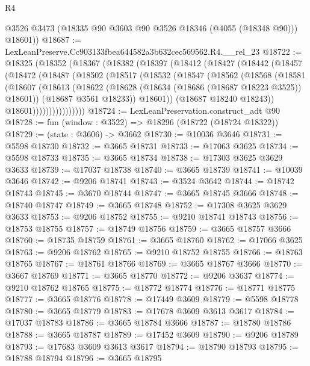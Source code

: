 \begin{lexlean}{R4}
\begin{coremodule}
        @3526
        @3473
        (@18335 @90 @3603 @90 @3526 @18346 (@4055 (@18348 @90)))
        @18601))
@18687 := LexLeanPreserve.Cc903133fbea644582a3b632cec569562.R4.__rel_23
@18722 := @18325
    (@18352
      (@18367
        (@18382
          (@18397
            (@18412
              (@18427
                (@18442
                  (@18457
                    (@18472
                      (@18487
                        (@18502
                          (@18517
                            (@18532
                              (@18547
                                (@18562
                                  (@18568
                                    (@18581
                                      (@18607
                                        (@18613
                                          (@18622
                                            (@18628 (@18634 (@18686 (@18687 @18223 @3525)) @18601))
                                            (@18687 @3561 @18233))
                                          @18601))
                                      (@18687 @18240 @18243))
                                    @18601))))))))))))))))
@18724 := LexLeanPreservation.construct_adt @90
@18728 := fun (window : @3522) => @18296 (@18722 (@18724 @18322))
@18729 := (state : @3606) -> @3662
@18730 := @10036 @3646
@18731 := @5598 @18730
@18732 := @3665 @18731
@18733 := @17063 @3625
@18734 := @5598 @18733
@18735 := @3665 @18734
@18738 := @17303 @3625 @3629 @3633
@18739 := @17037 @18738
@18740 := @3665 @18739
@18741 := @10039 @3646
@18742 := @9206 @18741
@18743 := @3524 @3642
@18744 := @18742 @18743
@18745 := @3670 @18744
@18747 := @3665 @18745 @3666
@18748 := @18740 @18747
@18749 := @3665 @18748
@18752 := @17308 @3625 @3629 @3633
@18753 := @9206 @18752
@18755 := @9210 @18741 @18743
@18756 := @18753 @18755
@18757 := @18749 @18756
@18759 := @3665 @18757 @3666
@18760 := @18735 @18759
@18761 := @3665 @18760
@18762 := @17066 @3625
@18763 := @9206 @18762
@18765 := @9210 @18752 @18755
@18766 := @18763 @18765
@18767 := @18761 @18766
@18769 := @3665 @18767 @3666
@18770 := @3667 @18769
@18771 := @3665 @18770
@18772 := @9206 @3637
@18774 := @9210 @18762 @18765
@18775 := @18772 @18774
@18776 := @18771 @18775
@18777 := @3665 @18776
@18778 := @17449 @3609
@18779 := @5598 @18778
@18780 := @3665 @18779
@18783 := @17678 @3609 @3613 @3617
@18784 := @17037 @18783
@18786 := @3665 @18784 @3666
@18787 := @18780 @18786
@18788 := @3665 @18787
@18789 := @17452 @3609
@18790 := @9206 @18789
@18793 := @17683 @3609 @3613 @3617
@18794 := @18790 @18793
@18795 := @18788 @18794
@18796 := @3665 @18795

\end{coremodule}
\end{lexlean}
